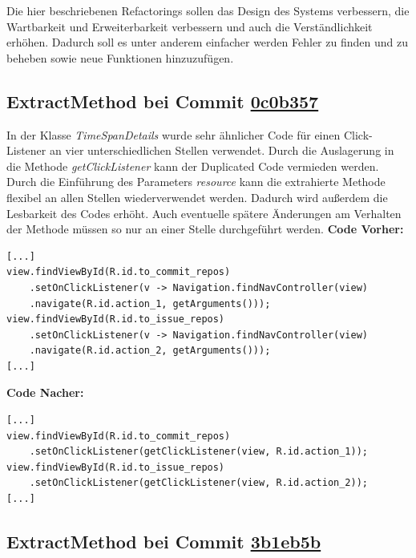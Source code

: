 \documentclass[12pt]{article}
\begin{document}
Die hier beschriebenen Refactorings sollen das Design des Systems verbessern, die Wartbarkeit und Erweiterbarkeit verbessern und auch die Verständlichkeit erhöhen.
Dadurch soll es unter anderem einfacher werden Fehler zu finden und zu beheben sowie neue Funktionen hinzuzufügen.


\subsection{ExtractMethod bei Commit \href{https://github.com/lukaspanni/OpenSourceStats/commit/0c0b357dee742575d8465ae26e64152bfecbf5ab} {0c0b357}}
\label{sec:ExtractMethod_TimeSpanDetails}

In der Klasse \textit{TimeSpanDetails} wurde sehr ähnlicher Code für einen Click-Listener an vier unterschiedlichen Stellen verwendet. Durch die Auslagerung in die Methode \textit{getClickListener}  kann der Duplicated Code vermieden werden. Durch die Einführung des Parameters \textit{resource} kann die extrahierte Methode flexibel an allen Stellen wiederverwendet werden. Dadurch wird außerdem die Lesbarkeit des Codes erhöht.
Auch eventuelle spätere Änderungen am Verhalten der Methode müssen so nur an einer Stelle durchgeführt werden.
\newline
\textbf{Code Vorher:} 
\begin{lstlisting}[breaklines=false]
[...]
view.findViewById(R.id.to_commit_repos)
    .setOnClickListener(v -> Navigation.findNavController(view)
    .navigate(R.id.action_1, getArguments()));
view.findViewById(R.id.to_issue_repos)
    .setOnClickListener(v -> Navigation.findNavController(view)
    .navigate(R.id.action_2, getArguments()));
[...]
\end{lstlisting}
\textbf{Code Nacher:} 
\begin{lstlisting}[breaklines=false]
[...]
view.findViewById(R.id.to_commit_repos)
    .setOnClickListener(getClickListener(view, R.id.action_1));
view.findViewById(R.id.to_issue_repos)
    .setOnClickListener(getClickListener(view, R.id.action_2));
[...]
\end{lstlisting}

\newpage
\subsection{ExtractMethod bei Commit \href{https://github.com/lukaspanni/OpenSourceStats/commit/3b1eb5bf6750c3ccaeb05962ec8a8ae743adbf2c} {3b1eb5b}}
\label{sec:ExtractMethod_Repository}
\end{document}
